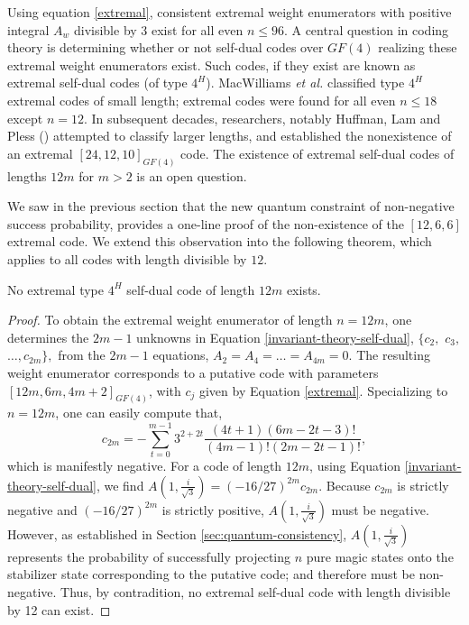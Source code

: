 \documentclass[11pt]{article}
\begin{document}
Using equation \eqref{extremal}, consistent extremal weight enumerators with positive integral $A_w$ divisible by 3 exist for all even $n \leq 96$. A central question in coding theory is determining whether or not self-dual codes over $GF(4)$ realizing these extremal weight enumerators exist. Such codes, if they exist are known as extremal self-dual codes (of type $4^H$). 
MacWilliams \textit{et al.} classified type $4^H$ extremal codes of small length; extremal codes were found for all even $n \leq 18$ except $n=12$. In subsequent decades, researchers, notably Huffman, Lam and Pless (\cite{lam1990there,huffman1990extremal, huffman1991extremal}) attempted to classify larger lengths, and established the nonexistence of an extremal $[24,12,10]_{ GF(4)}$ code. The existence of extremal self-dual codes of lengths $12m$ for $m>2$ is an open question. 

We saw in the previous section that the new quantum constraint of non-negative success probability, provides a one-line proof of the non-existence of the $[12,6,6]$ extremal code. We extend this observation into the following theorem, which applies to all codes with length divisible by $12$.  
\begin{theorem}
No extremal type $4^H$ self-dual code of length $12m$ 
exists. \label{thm: no-self-dual}
\end{theorem}
\begin{proof}
To obtain the extremal weight enumerator  of length $n=12m$, one determines the $2m-1$ unknowns in Equation \eqref{invariant-theory-self-dual}, $\{c_{2},$ $c_{3},$ $\ldots, c_{2m}\},$ from the $2m-1$ equations, $A_2=A_4=\ldots = A_{4m}=0$. The resulting weight enumerator  corresponds to a putative code with parameters $[12m,6m, 4m+2]_{GF(4)}$, with $c_j$ given by Equation  \eqref{extremal}. 
Specializing to $n=12m$, one can easily compute that, 
$$c_{2m} = -\sum_{t=0}^{m-1}3^{2+2t} \frac{(4 t+1) (6 m-2 t-3)!}{(4 m-1)! (2 m-2 t-1)!},$$
which is manifestly negative.
For a code of length $12m$, using Equation \eqref{invariant-theory-self-dual}, we find $A(1, \frac{i}{\sqrt{3}})=(-16/27)^{2m}c_{2m}$. Because $c_{2m}$ is strictly negative and $(-16/27)^{2m}$ is strictly positive,  $A(1, \frac{i}{\sqrt{3}})$ must be negative. However, as established in Section \ref{sec:quantum-consistency}, $A(1, \frac{i}{\sqrt{3}})$ represents the probability of successfully projecting $n$ pure magic states onto the stabilizer state corresponding to the putative code; and therefore must be non-negative. Thus, by contradition, no extremal self-dual code with length divisible by 12 can exist.\end{proof} 
\end{document}
